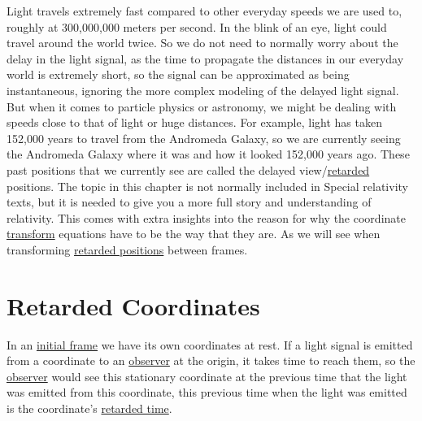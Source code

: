 Light travels extremely fast compared to other everyday speeds we are used to, roughly at 300,000,000 meters per second.
In the blink of an eye, light could travel around the world twice.
So we do not need to normally worry about the delay in the light signal, as the time to propagate the distances in our everyday world is extremely short, so the signal can be approximated as being instantaneous, ignoring the more complex modeling of the delayed light signal.
But when it comes to particle physics or astronomy, we might be dealing with speeds close to that of light or huge distances.
For example, light has taken 152,000 years to travel from the Andromeda Galaxy, so we are currently seeing the Andromeda Galaxy where it was and how it looked 152,000 years ago.
These past positions that we currently see are called the delayed view/\hyperlink{def-retarded-position}{retarded} positions.
The topic in this chapter is not normally included in Special relativity texts, but it is needed to give you a more full story and understanding of relativity.
This comes with extra insights into the reason for why the coordinate \hyperlink{def-transform}{transform} equations have to be the way that they are.
As we will see when transforming \hyperlink{def-retarded-position}{retarded positions} between frames.

\section{Retarded Coordinates} \label{sect: Retarded Coordinates}

In an \hyperlink{def-initial-Frame}{initial frame} we have its own coordinates at rest.
If a light signal is emitted from a coordinate to an \hyperlink{def-observer}{observer} at the origin, it takes time to reach them, so the \hyperlink{def-observer}{observer} would see this stationary coordinate at the previous time that the light was emitted from this coordinate, this previous time when the light was emitted is the coordinate's \hyperlink{def-retarded-time}{retarded time}.


